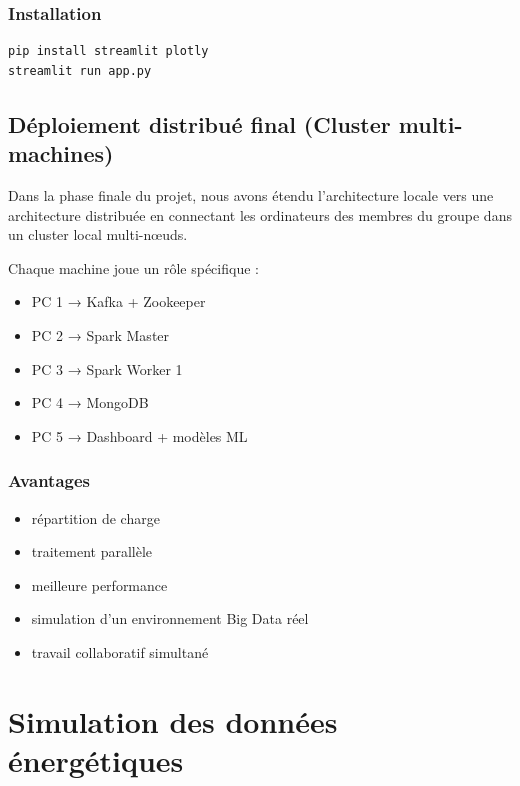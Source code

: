 \documentclass[12pt,a4paper]{report}
\begin{document}
\subsection{Installation}

\begin{verbatim}
pip install streamlit plotly
streamlit run app.py
\end{verbatim}

\section{Déploiement distribué final (Cluster multi-machines)}

Dans la phase finale du projet, nous avons étendu l’architecture locale vers une architecture distribuée en connectant les ordinateurs des membres du groupe dans un cluster local multi-nœuds.

Chaque machine joue un rôle spécifique :

\begin{itemize}
    \item PC 1 → Kafka + Zookeeper
    \item PC 2 → Spark Master
    \item PC 3 → Spark Worker 1
    \item PC 4 → MongoDB
    \item PC 5 → Dashboard + modèles ML
\end{itemize}

\subsection{Avantages}

\begin{itemize}
    \item répartition de charge
    \item traitement parallèle
    \item meilleure performance
    \item simulation d’un environnement Big Data réel
    \item travail collaboratif simultané
\end{itemize}

\chapter{Simulation des données énergétiques}
\end{document}
